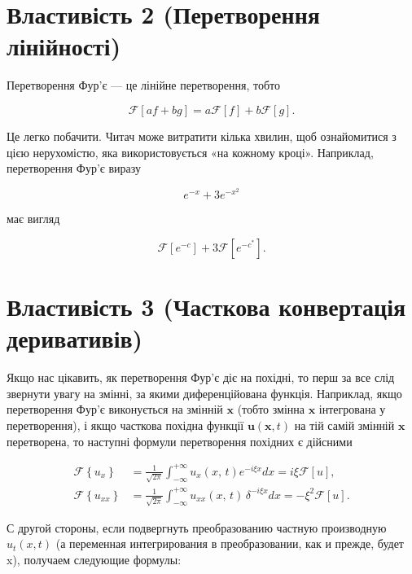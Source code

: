 \documentclass[
  ukrainian,
]{article}
\begin{document}
\section{Властивість 2 (Перетворення
лінійності)}\label{ux432ux43bux430ux441ux442ux438ux432ux456ux441ux442ux44c-2-ux43fux435ux440ux435ux442ux432ux43eux440ux435ux43dux43dux44f-ux43bux456ux43dux456ux439ux43dux43eux441ux442ux456}

Перетворення Фур'є --- це лінійне перетворення, тобто

\[
\mathscr{F}[af+bg]=a\mathscr{F}[f]+b\mathscr{F}[g].
\]

Це легко побачити. Читач може витратити кілька хвилин, щоб ознайомитися
з цією нерухомістю, яка використовується «на кожному кроці». Наприклад,
перетворення Фур'є виразу

\[
e^{-x} + 3e^{-x^2}
\]

має вигляд

\[
\mathscr{F}[e^{-c}] + 3\mathscr{F}[e^{-c^*}].
\]

\section{Властивість 3 (Часткова конвертація
деривативів)}\label{ux432ux43bux430ux441ux442ux438ux432ux456ux441ux442ux44c-3-ux447ux430ux441ux442ux43aux43eux432ux430-ux43aux43eux43dux432ux435ux440ux442ux430ux446ux456ux44f-ux434ux435ux440ux438ux432ux430ux442ux438ux432ux456ux432}

Якщо нас цікавить, як перетворення Фур'є діє на похідні, то перш за все
слід звернути увагу на змінні, за якими диференційована функція.
Наприклад, якщо перетворення Фур'є виконується на змінній
\(\boldsymbol{x}\) (тобто змінна \(\boldsymbol{x}\) інтегрована у
перетворення), і якщо часткова похідна функції
\(\boldsymbol{u}(\boldsymbol{x},t)\) на тій самій змінній
\(\boldsymbol{x}\) перетворена, то наступні формули перетворення
похідних є дійсними

\[
\begin{split} \mathcal{F}\left\{u_{x}\right\} &= \frac{1}{\sqrt{2\pi}} \int_{-\infty}^{+\infty} u_{x}\left(x,\,t\right) e^{-i\xi x} dx = i\xi \mathcal{F}\left[u\right], \\ \mathcal{F}\left\{u_{xx}\right\} &= \frac{1}{\sqrt{2\pi}} \int_{-\infty}^{+\infty} u_{xx}\left(x,\,t\right) \, \delta^{-i\xi x} dx = -\xi^{2} \mathcal{F}\left[u\right]. \end{split}
\]

С другой стороны, если подвергнуть преобразованию частную производную
\(u_t(x, t)\) (а переменная интегрирования в преобразовании, как и
прежде, будет x), получаем следующие формулы:
\end{document}
